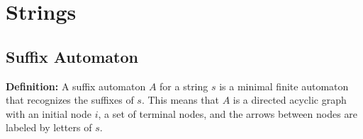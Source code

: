 \section{Strings}

\subsection{Suffix Automaton}

\textbf{Definition:} A suffix automaton $A$ for a string $s$ is a minimal finite automaton that recognizes the suffixes of $s$. This means that $A$ is a directed acyclic graph with an initial node $i$, a set of terminal nodes, and the arrows between nodes are labeled by letters of $s$.
